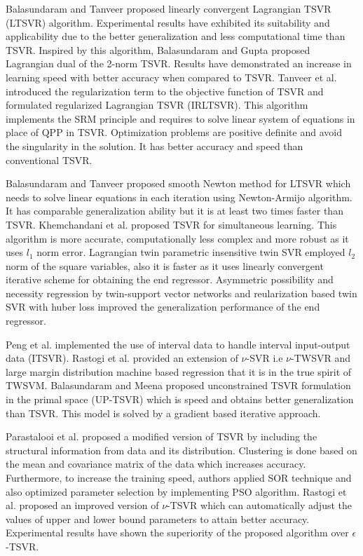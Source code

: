 \documentclass[pdflatex,sn-mathphys]{sn-jnl}%
\theoremstyle{thmstyleone}%
\theoremstyle{thmstyletwo}%
\theoremstyle{thmstylethree}%
\begin{document}
Balasundaram and Tanveer \cite{balasundaram2013lagrangian} proposed linearly convergent Lagrangian TSVR (LTSVR) algorithm. Experimental results have exhibited its suitability and applicability due to the better generalization and less computational time than TSVR. Inspired by this algorithm, Balasundaram and Gupta \cite{balasundaram2014training} proposed Lagrangian dual of the 2-norm TSVR. Results have demonstrated an increase in learning speed with better accuracy  when compared to TSVR. Tanveer et al. \cite{tanveer2016efficient} introduced the regularization term to the objective function of TSVR and formulated regularized Lagrangian TSVR (IRLTSVR). This algorithm implements the SRM principle and requires to solve linear system of equations in place of QPP in TSVR. Optimization problems are positive definite and avoid the singularity in the solution. It has better accuracy and speed than conventional TSVR.

Balasundaram and Tanveer \cite{balasundaram2013smooth} proposed smooth Newton method for LTSVR which needs to solve linear equations in each iteration using Newton-Armijo algorithm. It has comparable generalization ability but it is at least two times faster than TSVR. Khemchandani et al. \cite{khemchandani2013twin} proposed TSVR for simultaneous learning. This algorithm is more accurate, computationally less complex and more robust as it uses $l_1$ norm error.  Lagrangian twin parametric insensitive twin SVR \cite{gupta2020lagrangian,gupta2021efficient} employed $l_2$ norm of the square variables, also it is faster as it uses linearly convergent iterative scheme for obtaining the end regressor. Asymmetric possibility and necessity regression by twin-support vector networks \cite{hao2020asymmetric} and reularization based twin SVR with huber loss \cite{gupta2021regularization} improved the generalization performance of the end regressor. 


Peng et al. \cite{peng2015interval} implemented the use of interval data to handle interval input-output data (ITSVR). Rastogi et al. \cite{rastogipritam,rastogipritam1} provided an extension of $\nu$-SVR i.e $\nu$-TWSVR and large margin distribution machine based regression that it is in the true spirit of TWSVM. Balasundaram and Meena \cite{balasundaram2016training} proposed unconstrained TSVR formulation in the primal space (UP-TSVR) which is speed and obtains better generalization than TSVR. This model is solved by a gradient based iterative approach.

Parastalooi et al. \cite{parastalooi2016modified} proposed a modified version of TSVR by including the structural information from data and its distribution. Clustering is done based on the mean and covariance matrix of the data which increases accuracy. Furthermore, to increase the training speed, authors applied SOR technique and also optimized parameter selection by implementing PSO algorithm. Rastogi et al. \cite{rastogi2017nu} proposed an improved version of $\nu$-TSVR which can automatically adjust the values of upper and lower bound parameters to attain better accuracy. Experimental results have shown the superiority of the proposed algorithm over $\epsilon$-TSVR. 
\end{document}
